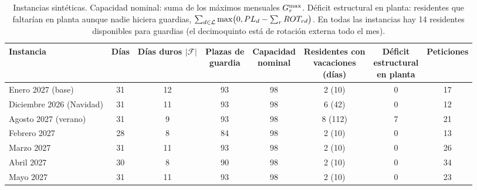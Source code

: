 \begin{table}[ht]
\centering\small
\caption{Instancias sintéticas. Capacidad nominal: suma de los máximos mensuales $G^{\protect\max}_r$. Déficit estructural en planta: residentes que faltarían en planta aunque nadie hiciera guardias, $\sum_{d \in \mathcal{L}} \protect\max\bigl(0, PL_d - \sum_r ROT_{rd}\bigr)$. En todas las instancias hay 14 residentes disponibles para guardias (el decimoquinto está de rotación externa todo el mes).}
\label{tab:instancias}
\setlength{\tabcolsep}{4pt}
\begin{tabular}{@{}lccccccc@{}}
\toprule
Instancia & Días & \makecell{Días\\ duros $|\mathcal{F}|$} & \makecell{Plazas de\\ guardia} & \makecell{Capacidad\\ nominal} & \makecell{Residentes con\\ vacaciones\\ (días)} & \makecell{Déficit\\ estructural\\ en planta} & Peticiones \\
\midrule
Enero 2027 (base)        & 31 & 12 & 93 & 98 & 2 (10)  & 0 & 17 \\
Diciembre 2026 (Navidad) & 31 & 11 & 93 & 98 & 6 (42)  & 0 & 12 \\
Agosto 2027 (verano)     & 31 &  9 & 93 & 98 & 8 (112) & 7 & 21 \\
Febrero 2027             & 28 &  8 & 84 & 98 & 2 (10)  & 0 & 13 \\
Marzo 2027               & 31 & 11 & 93 & 98 & 2 (10)  & 0 & 26 \\
Abril 2027               & 30 &  8 & 90 & 98 & 2 (10)  & 0 & 34 \\
Mayo 2027                & 31 & 11 & 93 & 98 & 2 (10)  & 0 & 23 \\
\bottomrule
\end{tabular}
\end{table}
